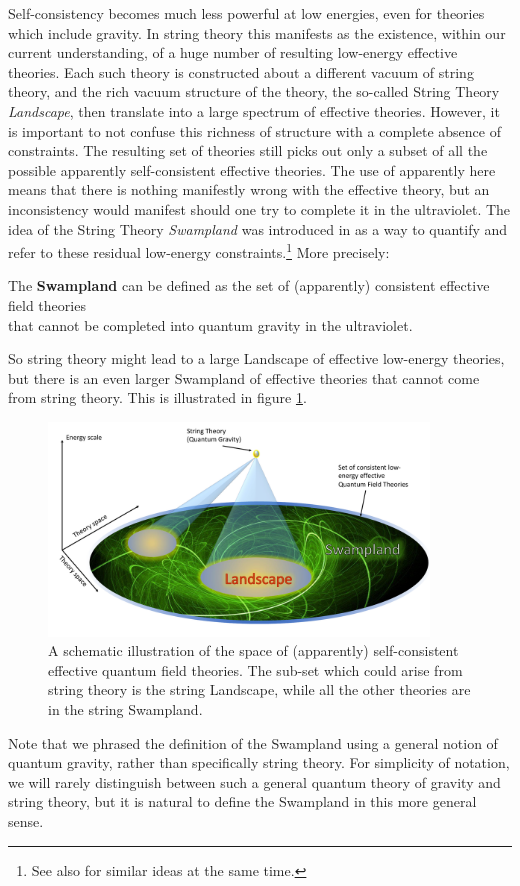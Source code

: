 \documentclass[11pt,a4paper]{article}
\numberwithin{equation}{section}
\numberwithin{table}{section}\setlength{\multlinegap}{25pt}
\begin{document}
Self-consistency becomes much less powerful at low energies, even for theories which include gravity. In string theory this manifests as the existence, within our current understanding, of a huge number of resulting low-energy effective theories. Each such theory is constructed about a different vacuum of string theory, and the rich vacuum structure of the theory, the so-called String Theory {\it Landscape}, then translate into a large spectrum of effective theories. However, it is important to not confuse this richness of structure with a complete absence of constraints. The resulting set of theories still picks out only a subset of all the possible apparently self-consistent effective theories. The use of apparently here means that there is nothing manifestly wrong with the effective theory, but an inconsistency would manifest should one try to complete it in the ultraviolet. The idea of the String Theory {\it Swampland} was introduced in \cite{Vafa:2005ui} as a way to quantify and refer to these residual low-energy constraints.\footnote{See also \cite{DouglasStrings2005} for similar ideas at the same time.} More precisely:
\begin{center}
The {\bf Swampland} can be defined as the set of (apparently) consistent effective field theories \\ that cannot be completed into quantum gravity in the ultraviolet.
\end{center}
So string theory might lead to a large Landscape of effective low-energy theories, but there is an even larger Swampland of effective theories that cannot come from string theory. This is illustrated in figure \ref{fig:sw}. 
\begin{figure}[t]
\centering
 \includegraphics[width=0.9\textwidth]{Swil.pdf}
\caption{A schematic illustration of the space of (apparently) self-consistent effective quantum field theories. The sub-set which could arise from string theory is the string Landscape, while all the other theories are in the string Swampland.}
\label{fig:sw}
\end{figure}
Note that we phrased the definition of the Swampland using a general notion of quantum gravity, rather than specifically string theory. For simplicity of notation, we will rarely distinguish between such a general quantum theory of gravity and string theory, but it is natural to define the Swampland in this more general sense. 
\end{document}

